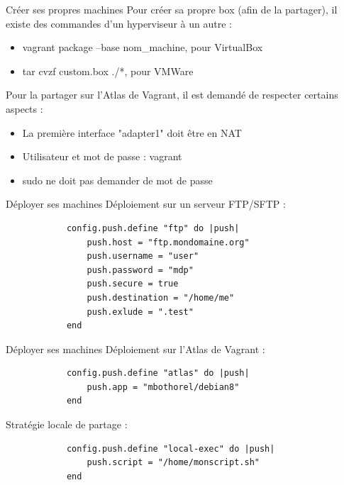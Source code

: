 \documentclass{beamer}
\begin{document}
    \begin{frame}{Créer ses propres machines}
        Pour créer sa propre box (afin de la partager), il existe des commandes d'un hyperviseur à un autre :
        \begin{itemize}
            \item{vagrant package --base nom\_machine, pour VirtualBox}
            \item{tar cvzf custom.box ./*, pour VMWare}
        \end{itemize}
        Pour la partager sur l'Atlas de Vagrant, il est demandé de respecter certains aspects :
        \begin{itemize}
            \item{La première interface "adapter1" doit être en NAT}
            \item{Utilisateur et mot de passe : vagrant}
            \item{sudo ne doit pas demander de mot de passe}
        \end{itemize}
    \end{frame}

    \begin{frame}[containsverbatim]{Déployer ses machines}
        Déploiement sur un serveur FTP/SFTP :
        \begin{verbatim}
            config.push.define "ftp" do |push|
                push.host = "ftp.mondomaine.org"
                push.username = "user"
                push.password = "mdp"
                push.secure = true
                push.destination = "/home/me"
                push.exlude = ".test"
            end
        \end{verbatim}
    \end{frame}
    
    \begin{frame}[containsverbatim]{Déployer ses machines}
        Déploiement sur l'Atlas de Vagrant :
        \begin{verbatim}
            config.push.define "atlas" do |push|
                push.app = "mbothorel/debian8"
            end
        \end{verbatim}
        Stratégie locale de partage :
        \begin{verbatim}
            config.push.define "local-exec" do |push|
                push.script = "/home/monscript.sh"
            end
        \end{verbatim}
    \end{frame}
    
\end{document}
